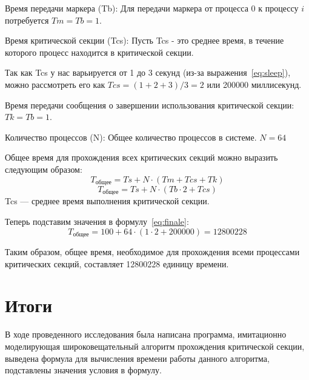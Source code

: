 \documentclass[openany, twoside, a4paper, 12pt]{extbook}
\begin{document}
		Время передачи маркера (Tb): Для передачи маркера от процесса 0 к процессу 
		$ i $ потребуется $ Tm = Tb = 1 $.
		
		Время критической секции (Tcs): Пусть Tcs - это среднее время,
		в течение которого процесс находится в критической секции.

		Так как Tcs у нас варьируется от 1 до 3 секунд (из-за выражения~\ref{eq:sleep}),
		можно рассмотреть его как $ Tcs = (1 + 2 + 3) / 3 = 2 $ или 200000 миллисекунд.
		
		Время передачи сообщения о завершении использования критической секции:
		$Tk = Tb = 1$.

		Количество процессов (N): Общее количество процессов в системе. $N = 64$
		
		Общее время для прохождения всех критических секций можно выразить следующим образом:
		\begin{equation}
			\label{eq:prefinale}
			T_{общее} = Ts + N \cdot (Tm + Tcs + Tk)
		\end{equation}
		\begin{equation}
			\label{eq:finale}
			T_{общее} = Ts + N \cdot (Tb \cdot 2 + Tcs)
		\end{equation}
		Tcs — среднее время выполнения критической секции.

		Теперь подставим значения в формулу~\ref{eq:finale}:
		\begin{equation}
			T_{общее} = 100 + 64 \cdot (1 \cdot 2 + 200000) = 12800228
		\end{equation}

		Таким образом, общее время,
		необходимое для прохождения всеми процессами критических секций,
		составляет 12800228 единицу времени.
	\section*{Итоги}
		В ходе проведенного исследования была написана программа, имитационно моделирующая
		широковещательный алгоритм прохождения критической секции, выведена формула для вычисления 
		времени работы данного алгоритма, подставлены значения условия в формулу.
\end{document}
